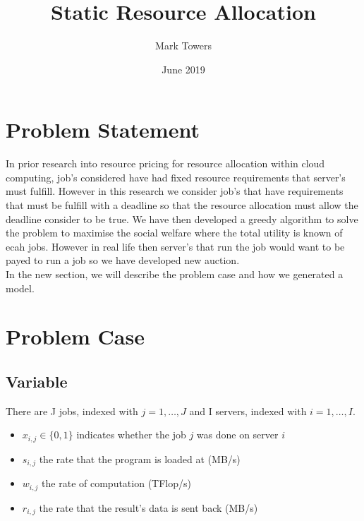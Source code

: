 \documentclass[fleqn]{article}
\title{Static Resource Allocation}
\author{Mark Towers}
\date{June 2019}
\begin{document}
\maketitle

\section{Problem Statement}\label{sec:problem-statement}
In prior research into resource pricing for resource allocation within cloud computing, job's considered have had fixed resource requirements that server's must fulfill.
However in this research we consider job's that have requirements that must be fulfill with a deadline so that the resource allocation must allow the deadline consider to be true.
We have then developed a greedy algorithm to solve the problem to maximise the social welfare where the total utility is known of ecah jobs.
However in real life then server's that run the job would want to be payed to run a job so we have developed new auction. \\
In the new section, we will describe the problem case and how we generated a model. \\

\section{Problem Case}\label{sec:problem-case}
\subsection{Variable}\label{subsec:variable}
There are J jobs, indexed with $ j = 1,\dots,J $ and I servers, indexed with $ i = 1,\dots,I $.
\begin{itemize}
    \item $ x_{i,j} \in \{0, 1\}$ indicates whether the job $j$ was done on server $i$
    \item $ s_{i,j} $ the rate that the program is loaded at (MB/s)
    \item $ w_{i,j} $ the rate of computation (TFlop/s)
    \item $ r_{i,j} $ the rate that the result's data is sent back (MB/s)
\end{itemize}
\end{document}
